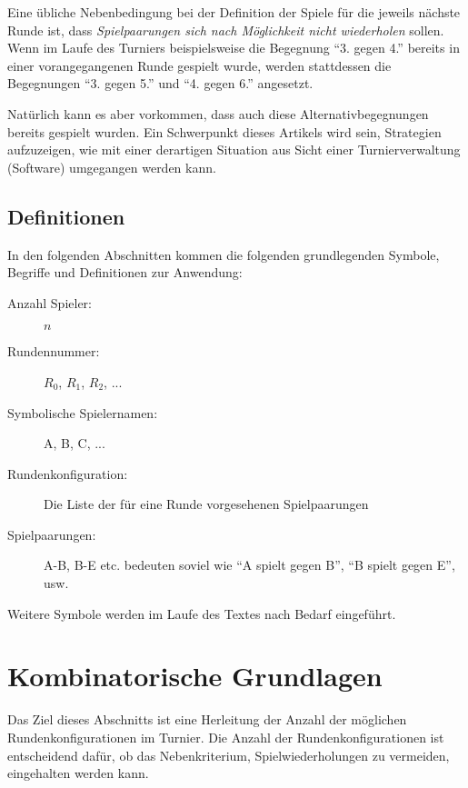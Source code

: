 \documentclass[DIV=15, 10pt]{scrartcl}
\begin{document}
Eine übliche Nebenbedingung bei der Definition der Spiele für die jeweils nächste Runde ist, dass \emph{Spielpaarungen sich nach Möglichkeit nicht wiederholen} sollen. Wenn im Laufe des Turniers beispielsweise die Begegnung "`3. gegen 4."' bereits in einer vorangegangenen Runde gespielt wurde, werden stattdessen die Begegnungen "`3. gegen 5."' und "`4. gegen 6."' angesetzt.

Natürlich kann es aber vorkommen, dass auch diese Alternativbegegnungen bereits gespielt wurden. Ein Schwerpunkt dieses Artikels wird sein, Strategien aufzuzeigen, wie mit einer derartigen Situation aus Sicht einer Turnierverwaltung (Software) umgegangen werden kann.

\subsection{Definitionen}

In den folgenden Abschnitten kommen die folgenden grundlegenden Symbole, Begriffe und Definitionen zur Anwendung:

\begin{description}

\item[Anzahl Spieler:] $n$

\item[Rundennummer:] $R_0$, $R_1$, $R_2$, ...

\item[Symbolische Spielernamen:] A, B, C, ...

\item[Rundenkonfiguration:] Die Liste der für eine Runde vorgesehenen Spielpaarungen

\item[Spielpaarungen:] A-B, B-E etc. bedeuten soviel wie "`A spielt gegen B"', "`B spielt gegen E"', usw.

\end{description}

Weitere Symbole werden im Laufe des Textes nach Bedarf eingeführt.

\section{Kombinatorische Grundlagen} 

Das Ziel dieses Abschnitts ist eine Herleitung der Anzahl der möglichen Rundenkonfigurationen im Turnier. Die Anzahl der Rundenkonfigurationen ist entscheidend dafür, ob das Nebenkriterium, Spielwiederholungen zu vermeiden, eingehalten werden kann.
\end{document}
